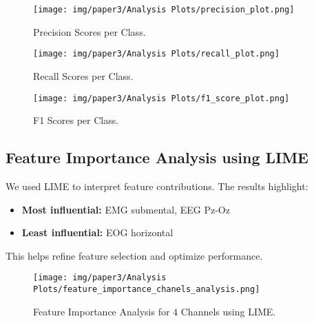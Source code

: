 \begin{figure}[H]
	\centering
	\texttt{[image: img/paper3/Analysis Plots/precision\_plot.png]}
	\caption{Precision Scores per Class.}
\end{figure}

\begin{figure}[H]
	\centering
	\texttt{[image: img/paper3/Analysis Plots/recall\_plot.png]}
	\caption{Recall Scores per Class.}
\end{figure}

\begin{figure}[H]
	\centering
	\texttt{[image: img/paper3/Analysis Plots/f1\_score\_plot.png]}
	\caption{F1 Scores per Class.}
\end{figure}

\subsection{Feature Importance Analysis using LIME}

We used LIME to interpret feature contributions. The results highlight:

\begin{itemize}
	\item \textbf{Most influential:} EMG submental, EEG Pz-Oz
	\item \textbf{Least influential:} EOG horizontal
\end{itemize}

This helps refine feature selection and optimize performance.

\begin{figure}[H]
	\centering
	\texttt{[image: img/paper3/Analysis Plots/feature\_importance\_chanels\_analysis.png]}
	\caption{Feature Importance Analysis for 4 Channels using LIME.}
\end{figure}
